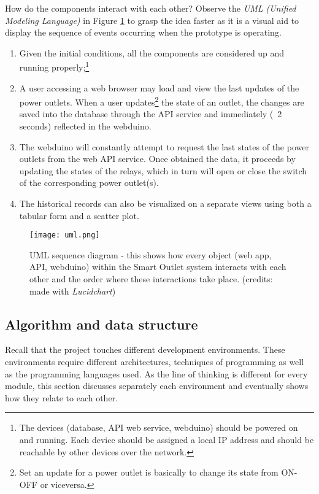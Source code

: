 \noindent
How do the components interact with each other? Observe the \emph{UML (Unified Modeling Language)} in Figure \ref{fig:uml-diagram} to grasp the idea faster as it is a visual aid to display the sequence of events occurring when the prototype is operating.
\begin{enumerate}
    \item Given the initial conditions, all the components are considered up and running properly;\footnote{The devices (database, API web service, webduino) should be powered on and running. Each device should be assigned a local IP address and should be reachable by other devices over the network.}
    \item A user accessing a web browser may load and view the last updates of the power outlets. When a user updates\footnote{Set an update for a power outlet is basically to change its state from ON-OFF or viceversa.} the state of an outlet, the changes are saved into the database through the API service and immediately (~2 seconds) reflected in the webduino.
    \item The webduino will constantly attempt to request the last states of the power outlets from the web API service. Once obtained the data, it proceeds by updating the states of the relays, which in turn will open or close the switch of the corresponding power outlet(s).
    \item The historical records can also be visualized on a separate views using both a tabular form and a scatter plot.
\end{enumerate}

\begin{figure}[ht!]
    \centering
    \texttt{[image: uml.png]}
    \caption{UML sequence diagram - this shows how every object (web app, API, webduino) within the Smart Outlet system interacts with each other and the order where these interactions take place. (credits: made with \emph{Lucidchart})}
    \label{fig:uml-diagram}
\end{figure}

\subsection{Algorithm and data structure}
Recall that the project touches different development environments. These environments require different architectures, techniques of programming as well as the programming languages used. As the line of thinking is different for every module, this section discusses separately each environment and eventually shows how they relate to each other.

